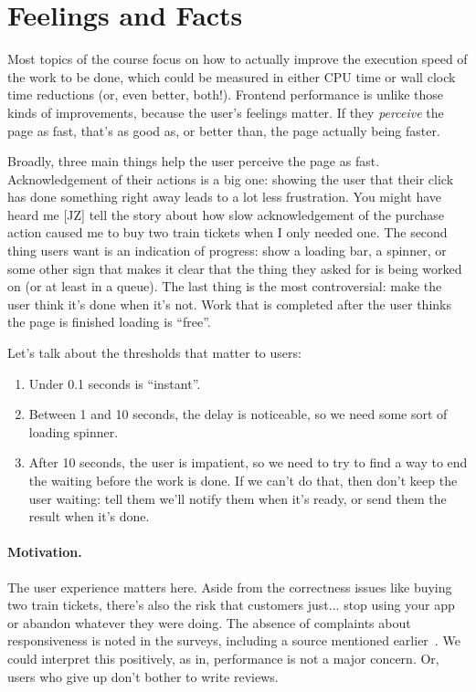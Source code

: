 




\section*{Feelings and Facts}
Most topics of the course focus on how to actually improve the execution speed of the work to be done, which could be measured in either CPU time or wall clock time reductions (or, even better, both!). Frontend performance is unlike those kinds of improvements, because the user's feelings matter. If they \textit{perceive} the page as fast, that's as good as, or better than, the page actually being faster.

Broadly, three main things help the user perceive the page as fast. Acknowledgement of their actions is a big one: showing the user that their click has done something right away leads to a lot less frustration. You might have heard me [JZ] tell the story about how slow acknowledgement of the purchase action caused me to buy two train tickets when I only needed one. The second thing users want is an indication of progress: show a loading bar, a spinner, or some other sign that makes it clear that the thing they asked for is being worked on (or at least in a queue). The last thing is the most controversial: make the user think it's done when it's not. Work that is completed after the user thinks the page is finished loading is ``free''. 

Let's talk about the thresholds that matter to users: 
\begin{enumerate}
	\item Under 0.1 seconds is ``instant''.
	\item Between 1 and 10 seconds, the delay is noticeable, so we need some sort of loading spinner.
	\item After 10 seconds, the user is impatient, so we need to try to find a way to end the waiting before the work is done. If we can't do that, then don't keep the user waiting: tell them we'll notify them when it's ready, or send them the result when it's done.
\end{enumerate}

\paragraph{Motivation.} The user experience matters here. Aside from the correctness issues like buying two train tickets, there's also the risk that customers just... stop using your app or abandon whatever they were doing. The absence of complaints about responsiveness is noted in the surveys, including a source mentioned earlier~\cite{free-apps}. We could interpret this positively, as in, performance is not a major concern. Or, users who give up don't bother to write reviews.

